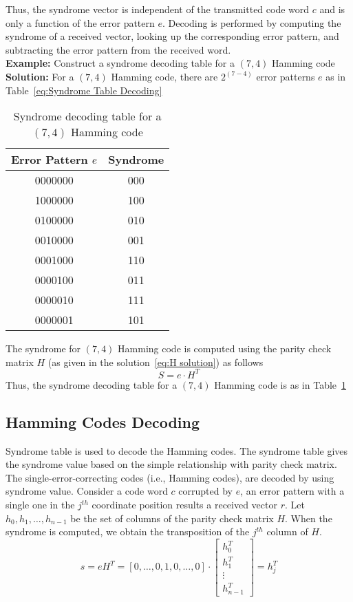 Thus, the syndrome vector is independent of the transmitted code word $c$ and is only a function of the error pattern $e$. Decoding is performed by computing the syndrome of a received vector, looking up the corresponding error pattern, and subtracting the error pattern from the received word. \\

\textbf{Example:} Construct a syndrome decoding table for a $(7, 4)$ Hamming code \\
\textbf{Solution:} For a $(7, 4)$ Hamming code, there are $2^{(7-4)}$ error patterns $e$ as in Table~\ref{eq:Syndrome Table Decoding}
\begin{table}[!ht]
    \centering
    \caption{Syndrome decoding table for a $(7, 4)$ Hamming code}
    \label{tbl:syndrome decoding table}
    \begin{tabular}{cc}
        \toprule
        Error Pattern $e$ & Syndrome \\
        \midrule
        0000000 & 000 \\
        1000000 & 100 \\
        0100000 & 010 \\
        0010000 & 001 \\
        0001000 & 110 \\
        0000100 & 011 \\
        0000010 & 111 \\
        0000001 & 101 \\
        \bottomrule
    \end{tabular}
\end{table}

The syndrome for $(7, 4)$ Hamming code is computed using the parity check matrix $H$ (as given in the solution~\ref{eq:H solution}) as follows
\[ S = e \cdot H^T \]
Thus, the syndrome decoding table for a $(7, 4)$ Hamming code is as in Table~\ref{tbl:syndrome decoding table}

\subsection{Hamming Codes Decoding}
Syndrome table is used to decode the Hamming codes. The syndrome table gives the syndrome value based on the simple relationship with parity check matrix. The single-error-correcting codes (i.e., Hamming codes), are decoded by using syndrome value. Consider a code word $c$ corrupted by $e$, an error pattern with a single one in the $j^{th}$ coordinate position results a received vector $r$. Let ${h_0, h_1, \ldots , h_{n-1}}$ be the set of columns of the parity check matrix $H$. When the syndrome is computed, we obtain the transposition of the $j^{th}$ column of $H$. \\
\begin{equation}
    \label{eq:hamming codes decoding}
    s = eH^T = [0, \ldots, 0,1,0, \ldots, 0] \cdot \left[ \begin{array}{c}
        h_0^T \\
        h_1^T \\
        \vdots \\
        h_{n-1}^T
    \end{array} \right] = h_j^T
\end{equation}

